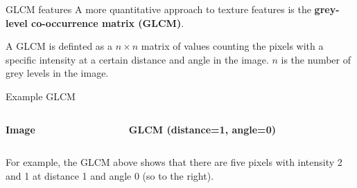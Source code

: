 \documentclass[9pt, aspectratio=169]{beamer}
\begin{document}
\begin{frame}
    {GLCM features}
    A more quantitative approach to texture features is the \textbf{grey-level co-occurrence matrix (GLCM)}.\\
    \vspace{2em}

    A GLCM is definted as a $n\times n$ matrix of values counting the pixels with a specific intensity at a certain distance and angle in the image. $n$ is the number of grey levels in the image.\\
\end{frame}

\begin{frame}
    {Example GLCM}
    \begin{columns}
        \begin{column}{.5\textwidth}
            \centering
            \textbf{Image}\\

        \end{column}
        \begin{column}{.5\textwidth}
            \centering
            \textbf{GLCM (distance=1, angle=0)}\\

        \end{column}
    \end{columns}

    For example, the GLCM above shows that there are five pixels with intensity 2 and 1 at distance 1 and angle 0 (so to the right).
\end{frame}
\end{document}
